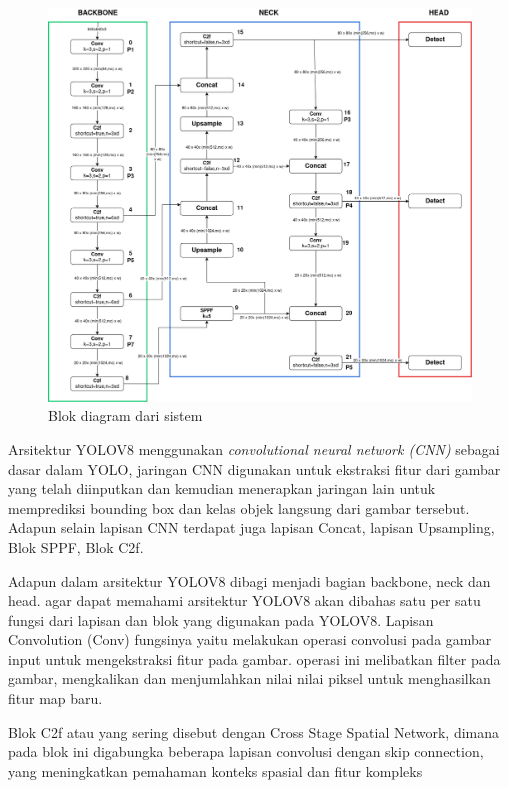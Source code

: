 \begin{figure} [H] \centering
  \includegraphics[scale=0.3]{gambar/yolov8.png}
  \caption{Blok diagram dari sistem}
  \label{fig:rancangan penelitian}
\end{figure}

Arsitektur YOLOV8 menggunakan \emph{convolutional neural network (CNN)} sebagai dasar dalam YOLO, jaringan CNN digunakan untuk ekstraksi fitur dari gambar yang telah diinputkan dan kemudian menerapkan jaringan lain untuk memprediksi bounding box dan kelas objek langsung dari gambar tersebut. Adapun selain lapisan CNN terdapat juga lapisan Concat, lapisan Upsampling, Blok SPPF, Blok C2f.

Adapun dalam arsitektur YOLOV8 dibagi menjadi bagian backbone, neck dan head. agar dapat memahami arsitektur YOLOV8 akan dibahas satu per satu fungsi dari lapisan dan blok yang digunakan pada YOLOV8. Lapisan Convolution (Conv) fungsinya yaitu melakukan operasi convolusi pada gambar input untuk mengekstraksi fitur pada gambar. operasi ini melibatkan filter pada gambar, mengkalikan dan menjumlahkan nilai nilai piksel untuk menghasilkan fitur map baru.

Blok C2f atau yang sering disebut dengan Cross Stage Spatial Network, dimana pada blok ini digabungka beberapa lapisan convolusi dengan skip connection, yang meningkatkan pemahaman konteks spasial dan fitur kompleks

